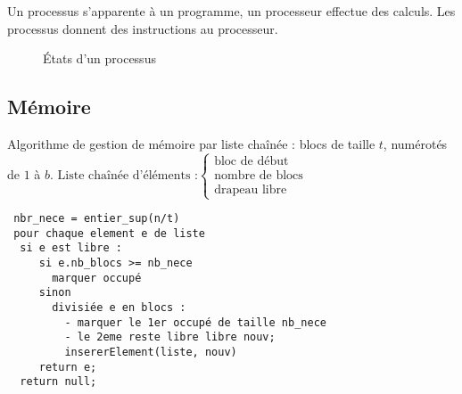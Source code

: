 \documentclass[11pt, a4paper]{article}
\begin{document}
Un processus s'apparente à un programme, un processeur effectue des calculs. Les processus donnent des instructions au processeur.

\begin{figure}[h]
\centering
{}
\caption{États d'un processus}
\end{figure}

\subsection{Mémoire}

Algorithme de gestion de mémoire par liste chaînée : blocs de taille $t$, numérotés de $1$ à $b$. $\mbox{Liste chaînée d’éléments :} \begin{cases} \mbox{bloc de début}\\ \mbox{nombre de blocs} \\ \mbox{drapeau libre} \end{cases}$


 \begin{verbatim}
 nbr_nece = entier_sup(n/t)
 pour chaque element e de liste
  si e est libre :
     si e.nb_blocs >= nb_nece
       marquer occupé
     sinon
       divisiée e en blocs :
         - marquer le 1er occupé de taille nb_nece
         - le 2eme reste libre libre nouv;
         insererElement(liste, nouv)
     return e;
  return null;
 \end{verbatim}
\end{document}
